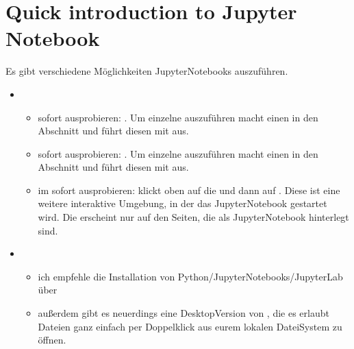 \documentclass[letterpaper,10pt,english]{jupyterBook}
\begin{document}
\section{Quick introduction to Jupyter Notebook}
\label{\detokenize{content/00_jupyter:quick-introduction-to-jupyter-notebook}}
\sphinxAtStartPar
Es gibt verschiedene Möglichkeiten Jupyter\sphinxhyphen{}Notebooks auszuführen.
\begin{itemize}
\item {} 
\sphinxAtStartPar
{}
\begin{itemize}
\item {} 
\sphinxAtStartPar
{} sofort ausprobieren: . Um einzelne  auszuführen macht einen  in den Abschnitt und führt diesen mit  aus.

\item {} 
\sphinxAtStartPar
{} sofort ausprobieren: . Um einzelne  auszuführen macht einen  in den Abschnitt und führt diesen mit  aus.

\item {} 
\sphinxAtStartPar
{} im  sofort ausprobieren: klickt oben auf die  und dann auf . Diese ist eine weitere interaktive Umgebung, in der das Jupyter\sphinxhyphen{}Notebook gestartet wird. Die  erscheint nur auf den Seiten, die als Jupyter\sphinxhyphen{}Notebook hinterlegt sind.

\end{itemize}

\item {} 
\sphinxAtStartPar
{}
\begin{itemize}
\item {} 
\sphinxAtStartPar
ich empfehle die Installation von Python/Jupyter\sphinxhyphen{}Notebooks/Jupyter\sphinxhyphen{}Lab über 

\item {} 
\sphinxAtStartPar
außerdem gibt es neuerdings eine Desktop\sphinxhyphen{}Version von , die es erlaubt  Dateien ganz einfach per Doppelklick aus eurem lokalen Datei\sphinxhyphen{}System zu öffnen.

\end{itemize}

\end{itemize}
\end{document}
